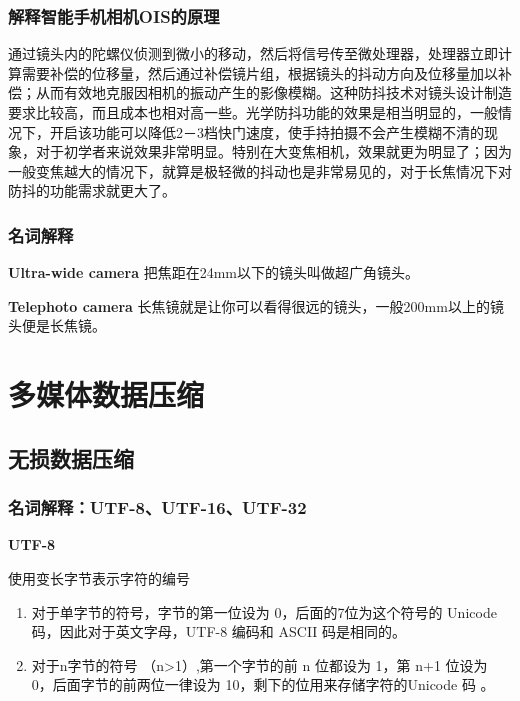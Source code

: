 \documentclass[UTF8,a4paper,AutoFakeBold,AutoFakeSlant]{ctexart}
\begin{document}
\subsubsection{解释智能手机相机OIS的原理}

通过镜头内的陀螺仪侦测到微小的移动，然后将信号传至微处理器，处理器立即计算需要补偿的位移量，然后通过补偿镜片组，根据镜头的抖动方向及位移量加以补偿；从而有效地克服因相机的振动产生的影像模糊。这种防抖技术对镜头设计制造要求比较高，而且成本也相对高一些。光学防抖功能的效果是相当明显的，一般情况下，开启该功能可以降低2－3档快门速度，使手持拍摄不会产生模糊不清的现象，对于初学者来说效果非常明显。特别在大变焦相机，效果就更为明显了；因为一般变焦越大的情况下，就算是极轻微的抖动也是非常易见的，对于长焦情况下对防抖的功能需求就更大了。


\subsubsection{名词解释}

\textbf{Ultra-wide camera}
把焦距在24mm以下的镜头叫做超广角镜头。

\textbf{Telephoto camera}
长焦镜就是让你可以看得很远的镜头，一般200mm以上的镜头便是长焦镜。










\section{多媒体数据压缩}


\subsection{无损数据压缩}


\subsubsection{名词解释：UTF-8、UTF-16、UTF-32}

\textbf{UTF-8}

使用变长字节表示字符的编号
\begin{enumerate}
	\item 对于单字节的符号，字节的第一位设为 0，后面的7位为这个符号的 Unicode码，因此对于英文字母，UTF-8 编码和 ASCII 码是相同的。
	\item 对于n字节的符号 （n>1）,第一个字节的前 n 位都设为 1，第 n+1 位设为 0，后面字节的前两位一律设为 10，剩下的位用来存储字符的Unicode 码 。
\end{enumerate}
\end{document}
